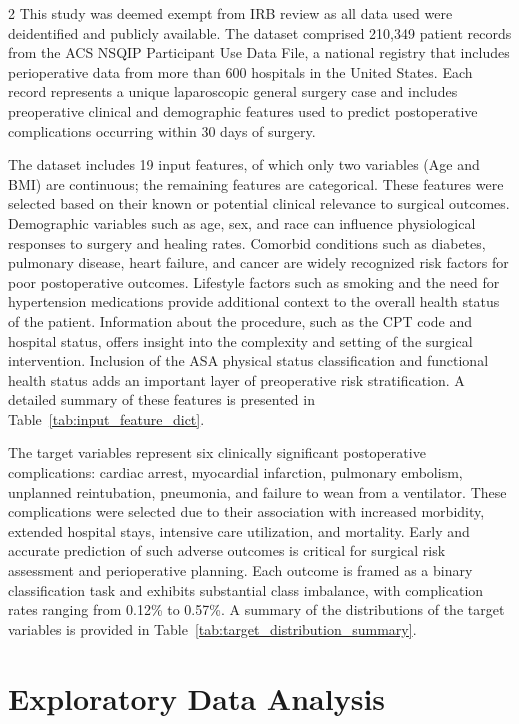\documentclass[bst/sn-nature]{sn-jnl}
\begin{document}
\begin{multicols}{2}
\quad This study was deemed exempt from IRB review as all data used were deidentified and publicly available. The dataset comprised 210,349 patient records from the ACS NSQIP Participant Use Data File, a national registry that includes perioperative data from more than 600 hospitals in the United States. Each record represents a unique laparoscopic general surgery case and includes preoperative clinical and demographic features used to predict postoperative complications occurring within 30 days of surgery.

The dataset includes 19 input features, of which only two variables (Age and BMI) are continuous; the remaining features are categorical. These features were selected based on their known or potential clinical relevance to surgical outcomes\cite{features}. Demographic variables such as age, sex, and race can influence physiological responses to surgery and healing rates. Comorbid conditions such as diabetes, pulmonary disease, heart failure, and cancer are widely recognized risk factors for poor postoperative outcomes\cite{comorbidity}. Lifestyle factors such as smoking and the need for hypertension medications provide additional context to the overall health status of the patient. Information about the procedure, such as the CPT code and hospital status, offers insight into the complexity and setting of the surgical intervention. Inclusion of the ASA physical status classification and functional health status adds an important layer of preoperative risk stratification. A detailed summary of these features is presented in Table~\ref{tab:input_feature_dict}.

The target variables represent six clinically significant postoperative complications: cardiac arrest, myocardial infarction, pulmonary embolism, unplanned reintubation, pneumonia, and failure to wean from a ventilator. These complications were selected due to their association with increased morbidity, extended hospital stays, intensive care utilization, and mortality. Early and accurate prediction of such adverse outcomes is critical for surgical risk assessment and perioperative planning. Each outcome is framed as a binary classification task and exhibits substantial class imbalance, with complication rates ranging from 0.12\% to 0.57\%. A summary of the distributions of the target variables is provided in Table~\ref{tab:target_distribution_summary}.

\section{Exploratory Data Analysis}


\end{multicols}
\end{document}
